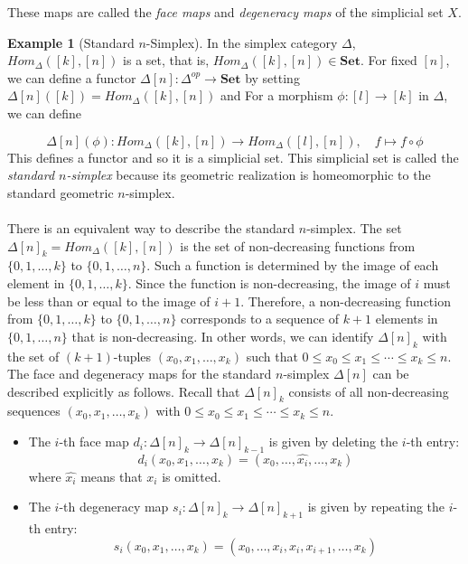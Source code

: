 \documentclass[11pt]{article}
\theoremstyle{definition}
\newtheorem{example}[definition]{Example}
\theoremstyle{plain}
\begin{document}
These maps are called the \emph{face maps} and \emph{degeneracy maps} of the simplicial set $X$.

\begin{example}[Standard $n$-Simplex]
    In the simplex category $\Delta$, $Hom_\Delta([k],[n])$ is a set, that is,
    $Hom_\Delta([k],[n]) \in \mathbf{Set}$.
    For fixed $[n]$, we can define a functor $\Delta[n] : \Delta^{op} \to \mathbf{Set}$ by setting $\Delta[n]([k]) = Hom_\Delta([k],[n])$ and
    For a morphism $\phi : [l] \to [k]$ in $\Delta$, we can define

    \[
        \Delta[n](\phi) : Hom_\Delta([k],[n]) \to Hom_\Delta([l],[n]), \quad f \mapsto f \circ \phi
    \]
    This defines a  functor and so it is a simplicial set.  This simplicial set is called the \emph{standard $n$-simplex} because its geometric realization is homeomorphic to the standard geometric $n$-simplex.

    \paragraph{}
    There is an equivalent way to describe the standard $n$-simplex. The set $\Delta[n]_k = Hom_\Delta([k],[n])$ is the set of non-decreasing functions from $\{0,1,\dots,k\}$ to $\{0,1,\dots,n\}$. Such a function is determined by the image of each element in $\{0,1,\dots,k\}$. Since the function is non-decreasing, the image of $i$ must be less than or equal to the image of $i+1$. Therefore, a non-decreasing function from $\{0,1,\dots,k\}$ to $\{0,1,\dots,n\}$ corresponds to a sequence of $k+1$ elements in $\{0,1,\dots,n\}$ that is non-decreasing. In other words, we can identify $\Delta[n]_k$ with the set of $(k+1)$-tuples $(x_0,x_1,\dots,x_k)$ such that $0 \leq x_0 \leq x_1 \leq \cdots \leq x_k \leq n$.
    The face and degeneracy maps for the standard $n$-simplex $\Delta[n]$ can be described explicitly as follows. Recall that $\Delta[n]_k$ consists of all non-decreasing sequences $(x_0, x_1, \ldots, x_k)$ with $0 \leq x_0 \leq x_1 \leq \cdots \leq x_k \leq n$.

    \begin{itemize}
        \item The $i$-th face map $d_i : \Delta[n]_k \to \Delta[n]_{k-1}$ is given by deleting the $i$-th entry:
              \[
                  d_i(x_0, x_1, \ldots, x_k) = (x_0, \ldots, \widehat{x_i}, \ldots, x_k)
              \]
              where $\widehat{x_i}$ means that $x_i$ is omitted.

        \item The $i$-th degeneracy map $s_i : \Delta[n]_k \to \Delta[n]_{k+1}$ is given by repeating the $i$-th entry:
              \[
                  s_i(x_0, x_1, \ldots, x_k) = (x_0, \ldots, x_i, x_i, x_{i+1}, \ldots, x_k)
              \]
    \end{itemize}

\end{example}
\end{document}
